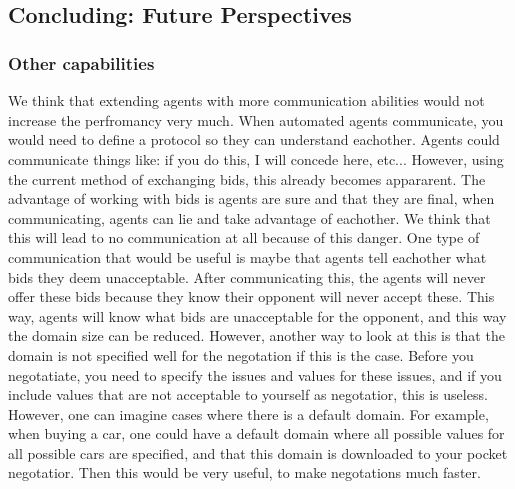  \\ 

 \\

\subsection{Concluding: Future Perspectives}

\subsubsection{Other capabilities}

We think that extending agents with more communication abilities would not 
increase the perfromancy very much. When automated agents communicate,
you would need to define a protocol so they can understand eachother.
Agents could communicate things like: if you do this, I will concede here, etc...
However, using the current method of exchanging bids, this already becomes 
appararent. The advantage of working with bids is agents are sure and that they are final,
when communicating, agents can lie and take advantage of eachother. 
We think that this will lead to no communication at all because of this danger.
One type of communication that would be useful is maybe that agents
tell eachother what bids they deem unacceptable. 
After communicating this, the agents will never offer these bids because they know
their opponent will never accept these. This way, 
agents will know what bids are unacceptable for the opponent, and this way
the domain size can be reduced. 
However, another way to look at this is that the domain is not specified well for the 
negotation if this is the case. Before you negotatiate, you need to specify the issues
and values for these issues, and if you include values that are not acceptable to 
yourself as negotatior, this is useless. However, one can imagine cases where
there is a default domain. For example, when buying a car, one could have a default domain
where all possible values for all possible cars are specified, and that this domain is 
downloaded to your pocket negotatior. Then this would be very useful,
to make negotations much faster.

